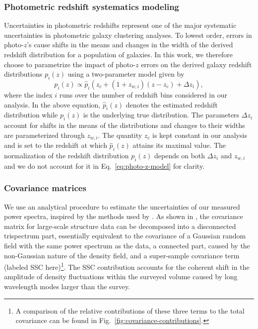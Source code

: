 \documentclass[a4paper,11pt]{article}
\begin{document}
  \subsubsection{Photometric redshift systematics modeling}\label{sssec:methods.theory.photoz_syst}
    Uncertainties in photometric redshifts represent one of the major systematic uncertainties in photometric galaxy clustering analyses. To lowest order, errors in photo-$z$'s cause shifts in the means and changes in the width of the derived redshift distribution for a population of galaxies. In this work, we therefore choose to parametrize the impact of photo-$z$ errors on the derived galaxy redshift distributions $p_{i}(z)$ using a two-parameter model given by
    \begin{equation}
      p_{i}(z) \propto \hat{p}_{i}(z_{c} + (1 + z_{w, i})(z-z_{c}) + \Delta z_{i}),
      \label{eq:photo-z-model}
    \end{equation} 
    where the index $i$ runs over the number of redshift bins considered in our analysis. In the above equation, $\hat{p}_{i}(z)$ denotes the estimated redshift distribution while $p_{i}(z)$ is the underlying true distribution. The parameters $\Delta z_{i}$ account for shifts in the means of the distributions and changes to their widths are parameterized through $z_{w, i}$. The quantity $z_{c}$ is kept constant in our analysis and is set to the redshift at which $\hat{p}_{i}(z)$ attains its maximal value. The normalization of the redshift distribution $p_{i}(z)$ depends on both $\Delta z_{i}$ and $z_{w, i}$ and we do not account for it in Eq.~\ref{eq:photo-z-model} for clarity.
    
  \subsubsection{Covariance matrices}\label{sssec:methods.theory.covar}
    We use an analytical procedure to estimate the uncertainties of our measured power spectra, inspired by the methods used by \cite{Krause:2017}. As shown in \cite{2009MNRAS.395.2065T,Takada:2013}, the covariance matrix for large-scale structure data can be decomposed into a disconnected trispectrum part, essentially equivalent to the covariance of a Gaussian random field with the same power spectrum as the data, a connected part, caused by the non-Gaussian nature of the density field, and a super-sample covariance term (labeled SSC here)\footnote{A comparison of the relative contributions of these three terms to the total covariance can be found in Fig.~\ref{fig:covariance-contributions}.}. The SSC contribution accounts for the coherent shift in the amplitude of density fluctuations within the surveyed volume caused by long wavelength modes larger than the survey.
    
\end{document}
